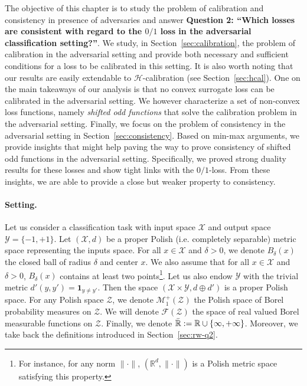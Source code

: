 




The objective of this chapter is to study the problem of calibration and consistency in presence of adversaries and answer \textbf{Question 2: ``Which losses are consistent with regard to the $0/1$ loss in the adversarial classification setting?''}. We study, in Section~\ref{sec:calibration}, the problem of calibration in the adversarial setting and provide both necessary and sufficient conditions for a loss to be calibrated in this setting. It is also worth noting that our results are easily extendable to  $\mathcal{H}$-calibration (see Section~\ref{sec:hcal}). One on the main takeaways of our analysis is that  no convex surrogate loss can be calibrated in the adversarial setting. We however characterize a set of non-convex loss functions, namely \emph{shifted odd functions} that solve the calibration problem in the adversarial setting. Finally, we focus on the problem of consistency in the adversarial setting in Section~\ref{sec:consistency}. Based on min-max arguments, we provide insights that might help paving the way to prove consistency of shifted odd functions in the adversarial setting. Specifically, we proved strong duality results for these losses and show tight links with the $0/1$-loss. From these insights, we are able to provide a close but weaker property to consistency.

\paragraph{Setting.} Let us consider a classification task with input space $\mathcal{X}$ and output space $\mathcal{Y}=\{-1,+1\}$. Let $(\mathcal{X},d)$ be a proper Polish (i.e. completely separable) metric space representing the inputs space. For all $x\in\mathcal{X}$ and $\delta>0$, we denote $B_\delta(x)$ the closed ball of radius $\delta$ and center $x$. We also assume that for all $x\in\mathcal{X}$ and $\delta>0$,  $B_\delta(x)$ contains at least two points\footnote{For instance, for any norm $\lVert\cdot\rVert$,  $(\mathbb{R}^d,\lVert \cdot \rVert)$ is a Polish metric space satisfying this property.}. Let us also endow $\mathcal{Y}$ with the trivial metric  $d'(y,y') = \mathbf{1}_{y\neq y'}$. Then the space $(\mathcal{X}\times\mathcal{Y},d\oplus d')$ is a proper Polish space. For any Polish space $\mathcal{Z}$, we denote $\mathcal{M}^+_1(\mathcal{Z})$ the Polish space of Borel probability measures on $\mathcal{Z}$. We will denote $\mathcal{F}(\mathcal{Z})$ the space of real valued Borel measurable functions on $\mathcal{Z}$. Finally, we denote $\bar{\mathbb{R}}:=\mathbb{R}\cup\{\-\infty,+\infty\}$. Moreover, we take back the definitions introduced in Section~\ref{sec:rw-q2}.



